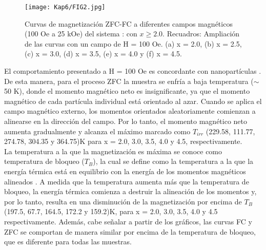 \begin{figure}[H]
  \centering%

  \texttt{[image: Kap6/FIG2.jpg]}%
  \caption{Curvas de magnetización ZFC-FC a diferentes campos magnéticos (100
  Oe a 25 kOe) del sistema : con $x \geq
    2.0$. Recuadros: Ampliación de las curvas con un campo de H = 100 Oe. (a) x =
  2.0, (b) x = 2.5, (c) x = 3.0, (d) x = 3.5, (e) x = 4.0 y (f) x = 4.5. }
  \label{fig:zfc}
\end{figure}

El comportamiento presentado a H = 100 Oe es concordante con nanopartículas
\@{}
\cite{singh2017shape,gaona2021characterization}. De esta manera, para el proceso ZFC la muestra se enfría a baja
temperatura ($\sim $ 50 K), donde el momento magnético neto es insignificante,
ya que
el momento magnético de cada partícula individual está orientado al azar.
Cuando se aplica el campo magnético externo, los momentos orientados
aleatoriamente comienzan a alinearse en la dirección del campo. Por lo tanto,
el momento magnético neto aumenta gradualmente y alcanza el máximo marcado como
$T_{irr}$ (229.58, 111.77, 274.78, 304.35 y 364.75)K para x = 2.0, 3.0, 3.5,
4.0 y
4.5, respectivamente.\\

La temperatura a la que la magnetización es máxima se conoce como temperatura
de bloqueo ($T_B$), la cual se define como la temperatura a la que la energía
térmica está en equilibrio con la energía de los momentos magnéticos alineados
\cite{shao2018preparation}.
A medida que la temperatura aumenta más que la temperatura de bloqueo, la
energía térmica comienza a destruir la alineación de los momentos y, por lo
tanto, resulta en una disminución de la magnetización por encima de $T_B$
(197.5,
67.7, 164.5, 172.2 y 159.2)K, para x = 2.0, 3.0, 3.5, 4.0 y 4.5
respectivamente.
Además, cabe señalar a partir de los gráficos, las curvas FC
y ZFC se comportan de manera similar por encima de la temperatura de bloqueo,
que es diferente para todas las muestras.\\

